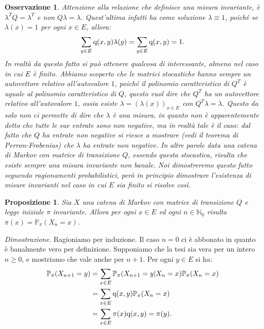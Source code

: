 \documentclass[11pt]{book}
\makeatletter
\theoremstyle{Definizione}
\theoremstyle{TeoremaProposizioneLemmaCorollario}
\newtheorem{mypropo}[myteo]{Proposizione}
\theoremstyle{OsservazioneNota}
\newtheorem{myobs}{Osservazione}[section]
\renewenvironment{proof}[1][\proofname]{\par
  \normalfont \topsep6\p@\@plus6\p@\relax
  \trivlist
  \item[\hskip\labelsep
        \itshape
    #1\@addpunct{.}]\ignorespaces
}{%
  \endtrivlist\@endpefalse
}
\newcommand{\N}{\mathbb{N}}
\renewcommand{\P}{\mathbb{P}}
\newcommand{\q}{\textup{q}}
\renewenvironment{proof}{\textsl{Dimostrazione}.}{}
\makeatother
\begin{document}
\begin{myobs}
Attenzione alla relazione che definisce una misura invariante, è $\lambda^T Q = \lambda^T$ e non $Q \lambda = \lambda$. Quest'ultima infatti ha come soluzione $\lambda \equiv 1$, poiché se $\lambda(x) = 1$ per ogni $x\in E$, allora:
$$
\sum_{y\in E} \q(x,y)\lambda(y) = \sum_{y\in E} \q(x,y) = 1.
$$
In realtà da questo fatto si può ottenere qualcosa di interessante, almeno nel caso in cui $E$ è finito. Abbiamo scoperto che le matrici stocastiche hanno sempre un autovettore relativo all'autovalore $1$, poiché il polinomio caratteristico di $Q^T$ è uguale al polinomio caratteristico di $Q$, questo vuol dire che $Q^T$ ha un autovettore relativo all'autovalore $1$, ossia esiste $\lambda = (\lambda(x))_{x\in E}$ con $Q^T \lambda = \lambda$. Questo da solo non ci permette di dire che $\lambda$ è una misura, in quanto non è apparentemente detto che tutte le sue entrate sono non negative, ma in realtà tale è il caso: dal fatto che $Q$ ha entrate non negative si riesce a mostrare (vedi il teorema di Perron-Frobenius) che $\lambda$ ha entrate non negative. In altre parole data una catena di Markov con matrice di transizione $Q$, essendo questa stocastica, risulta che esiste sempre una misura invariante non banale.  Noi dimostreremo questo fatto seguendo ragionamenti probabilistici, però in principio dimostrare l'esistenza di misure invarianti nel caso in cui $E$ sia finito si risolve così.
\end{myobs}
\begin{boxpro}
\begin{mypropo}
Sia $X$ una catena di Markov con matrice di transizione $Q$ e legge iniziale $\pi$ invariante. Allora per ogni $x\in E$ ed ogni $n\in \N_0$ risulta $\pi(x) = \P_\pi(X_n = x)$.
\end{mypropo}
\tcblower
\begin{proof}
Ragioniamo per induzione. Il caso $n = 0$ ci è abbonato in quanto è banalmente vero per definizione. Supponiamo che la tesi sia vera per un intero $n\geq 0$, e mostriamo che vale anche per $n+1$. Per ogni $y\in E$ si ha:
\begin{align*}
\P_\pi(X_{n+1} = y) &= \sum_{x\in E} \P_\pi(X_{n+1} = y | X_n = x) \P_\pi(X_n = x)\\
&= \sum_{x\in E} \q(x,y) \P_{\pi}(X_n = x)\\
&= \sum_{x\in E} \pi(x)\q(x,y) = \pi(y).
\end{align*}
\end{proof}
\end{boxpro}
\noindent
\end{document}
